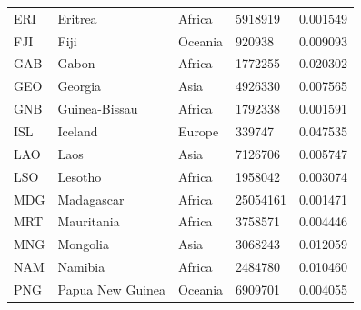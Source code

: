 \documentclass[11pt]{report}
\begin{document}
\begin{table}[]
\begin{tabular}{lllll}
            ERI                           & Eritrea                   & Africa                         & 5918919                       & 0.001549                           \\
            FJI                           & Fiji                      & Oceania                        & 920938                        & 0.009093                           \\
            GAB                           & Gabon                     & Africa                         & 1772255                       & 0.020302                           \\
            GEO                           & Georgia                   & Asia                           & 4926330                       & 0.007565                           \\
            GNB                           & Guinea-Bissau             & Africa                         & 1792338                       & 0.001591                           \\
            ISL                           & Iceland                   & Europe                         & 339747                        & 0.047535                           \\
            LAO                           & Laos                      & Asia                           & 7126706                       & 0.005747                           \\
            LSO                           & Lesotho                   & Africa                         & 1958042                       & 0.003074                           \\
            MDG                           & Madagascar                & Africa                         & 25054161                      & 0.001471                           \\
            MRT                           & Mauritania                & Africa                         & 3758571                       & 0.004446                           \\
            MNG                           & Mongolia                  & Asia                           & 3068243                       & 0.012059                           \\
            NAM                           & Namibia                   & Africa                         & 2484780                       & 0.010460                           \\
            PNG                           & Papua New Guinea          & Oceania                        & 6909701                       & 0.004055                           \\

\end{tabular}
\end{table}
\end{document}

